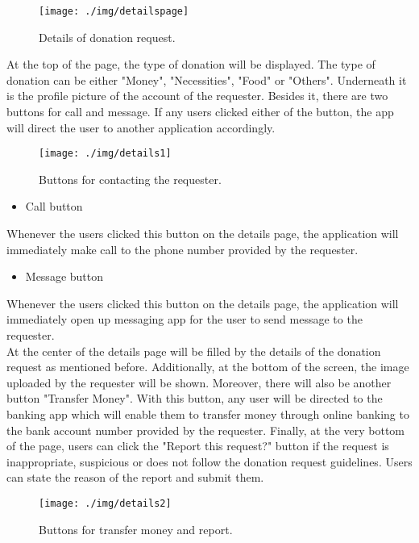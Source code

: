 \documentclass[conference]{IEEEtran}
\begin{document}
\begin{figure}[h!]
\texttt{[image: ./img/detailspage]}
\centering
\caption{Details of donation request.}
\end{figure}
At the top of the page, the type of donation will be displayed. The type of donation can be either "Money", "Necessities", "Food" or "Others". Underneath it is the profile picture of the account of the requester. Besides it, there are two buttons for call and message. If any users clicked either of the button, the app will direct the user to another application accordingly.

\begin{figure}[h!]
\texttt{[image: ./img/details1]}
\centering
\caption{Buttons for contacting the requester.}
\end{figure}

\begin{itemize}
\item Call button
\end{itemize}
Whenever the users clicked this button on the details page, the application will immediately make call to the phone number provided by the requester.
\begin{itemize}
\item Message button
\end{itemize}
Whenever the users clicked this button on the details page, the application will immediately open up messaging app for the user to send message to the requester.\\

At the center of the details page will be filled by the details of the donation request as mentioned before. Additionally, at the bottom of the screen, the image uploaded by the requester will be shown. Moreover, there will also be another button "Transfer Money". With this button, any user will be directed to the banking app which will enable them to transfer money through online banking to the bank account number provided by the requester. Finally, at the very bottom of the page, users can click the "Report this request?" button if the request is inappropriate, suspicious or does not follow the donation request guidelines. Users can state the reason of the report and submit them.

\begin{figure}[h!]
\texttt{[image: ./img/details2]}
\centering
\caption{Buttons for transfer money and report.}
\end{figure}
\end{document}
